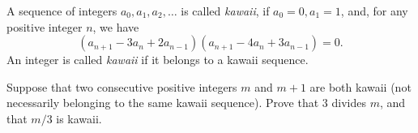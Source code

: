 A sequence of integers $a_0, a_1, a_2, \ldots$ is called \emph{kawaii}, if $a_0 = 0, a_1 = 1$, and, for any positive integer $n$, we have
\[
(a_{n+1} - 3a_n + 2a_{n-1})(a_{n+1} - 4a_n + 3a_{n-1}) = 0.
\]
An integer is called \emph{kawaii} if it belongs to a kawaii sequence.

Suppose that two consecutive positive integers $m$ and $m+1$ are both kawaii (not necessarily belonging to the same kawaii sequence). Prove that $3$ divides $m$, and that $m/3$ is kawaii.
